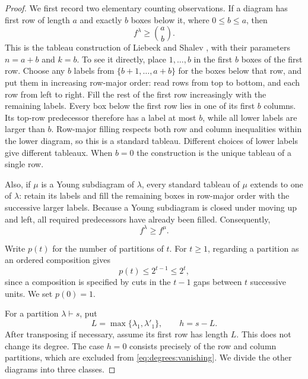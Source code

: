 \begin{proof}
We first record two elementary counting observations.
If a diagram has first row of length $a$ and exactly $b$ boxes below it,
where $0\le b\le a$, then
\begin{equation}
  f^\lambda\ge \binom{a}{b}.
  \label{eq:degrees:tableau-construction}
\end{equation}
This is the tableau construction of Liebeck and Shalev
\cite[Lemma~2.1]{liebeck-shalev2004}, with their parameters $n=a+b$ and
$k=b$. To see it directly, place $1,\ldots,b$ in the first $b$ boxes of
the first row.
Choose any $b$ labels from $\{b+1,\ldots,a+b\}$ for the boxes below
that row, and put them in increasing row-major order: read rows from
top to bottom, and each row from left to right. Fill the rest of the
first row increasingly with the remaining labels. Every box below
the first row lies in one of its first $b$ columns. Its top-row
predecessor therefore has a label at most $b$, while all lower labels
are larger than $b$. Row-major filling respects both row and column
inequalities within the lower diagram, so this is a standard tableau.
Different choices of lower labels give different tableaux. When $b=0$
the construction is the unique tableau of a single row.

Also, if $\mu$ is a Young subdiagram of $\lambda$, every standard
tableau of $\mu$ extends to one of $\lambda$: retain its labels and
fill the remaining boxes in row-major order with the successive
larger labels. Because a Young subdiagram is closed under moving up
and left, all required predecessors have already been filled.
Consequently,
\begin{equation}
  f^\lambda\ge f^\mu.
  \label{eq:degrees:extension}
\end{equation}

Write $p(t)$ for the number of partitions of $t$. For $t\ge 1$,
regarding a partition as an ordered composition gives
\begin{equation}
  p(t)\le 2^{t-1}\le 2^t,
  \label{eq:degrees:partition-count}
\end{equation}
since a composition is specified by cuts in the $t-1$ gaps between
$t$ successive units. We set $p(0)=1$.

For a partition $\lambda\vdash s$, put
\[
  L=\max\{\lambda_1,\lambda'_1\},\qquad h=s-L.
\]
After transposing if necessary, assume its first row has length $L$.
This does not change its degree. The case $h=0$ consists precisely of
the row and column partitions, which are excluded from
\eqref{eq:degrees:vanishing}. We divide the other diagrams into three
classes.


\end{proof}
